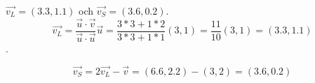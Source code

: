 $\vec{v_L} = (3.3, 1.1)$ och $\vec{v_S} = (3.6, 0.2)$. 
\[\vec{v_L} = \frac{\vec{u} \cdot \vec{v}}{\vec{u} \cdot \vec{u}}\vec{u}
= \frac{3*3+1*2}{3*3+1*1} (3,1) = \frac{11}{10} (3, 1) = (3.3, 1.1)\]. 

\[\vec{v_S} = 2\vec{v_L} - \vec{v} = (6.6, 2.2) - (3, 2) = (3.6, 0.2)\]
